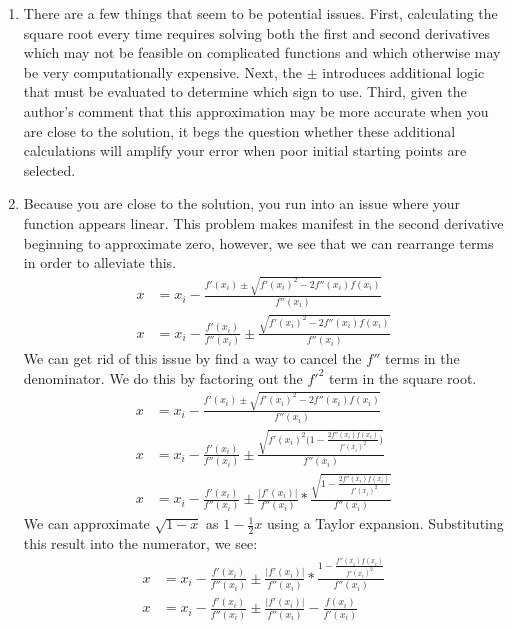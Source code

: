 \documentclass[11pt,a4paper]{article}
\begin{document}
\begin{itemize}
\begin{enumerate} [label={\alph*)}]
					\item There are a few things that seem to be potential issues. First, calculating the square root every time requires solving both the first and second derivatives which may not be feasible on complicated functions and which otherwise may be very computationally expensive. Next, the $\pm$ introduces additional logic that must be evaluated to determine which sign to use. Third, given the author's comment that this approximation may be more accurate when you are close to the solution, it begs the question whether these additional calculations will amplify your error when poor initial starting points are selected.
					
					\item Because you are close to the solution, you run into an issue where your function appears linear. This problem makes manifest in the second derivative beginning to approximate zero, however, we see that we can rearrange terms in order to alleviate this.
					\begin{align*}
						x &= x_i - \frac{f'(x_i)\pm \sqrt{f'(x_i)^2-2f''(x_i)f(x_i)}}{f''(x_i)} \\
						x &= x_i - \frac{f'(x_i)}{f''(x_i)} \pm\frac{\sqrt{f'(x_i)^2-2f''(x_i)f(x_i)}}{f''(x_i)}
					\end{align*}
					We can get rid of this issue by find a way to cancel the $f''$ terms in the denominator. We do this by factoring out the $f'^2$ term in the square root.
					\begin{align*}
						x &= x_i - \frac{f'(x_i)\pm \sqrt{f'(x_i)^2-2f''(x_i)f(x_i)}}{f''(x_i)} \\
						x &= x_i - \frac{f'(x_i)}{f''(x_i)} \pm\frac{\sqrt{f'(x_i)^2\Big(1-\frac{2f''(x_i)f(x_i)}{f'(x_i)^2}\Big)}}{f''(x_i)} \\
						x &= x_i - \frac{f'(x_i)}{f''(x_i)} \pm \frac{\vert f'(x_i)\vert}{f''(x_i)} *\frac{\sqrt{1-\frac{2f''(x_i)f(x_i)}{f'(x_i)^2}}}{f''(x_i)}
					\end{align*}
					We can approximate $\sqrt{1-x}$ as $1-\frac{1}{2}x$ using a Taylor expansion. Substituting this result into the numerator, we see:
					\begin{align*}
						x &= x_i - \frac{f'(x_i)}{f''(x_i)} \pm \frac{\vert f'(x_i)\vert}{f''(x_i)} *\frac{1-\frac{f''(x_i)f(x_i)}{f'(x_i)^2}}{f''(x_i)} \\
						x &= x_i - \frac{f'(x_i)}{f''(x_i)} \pm \frac{\vert f'(x_i)\vert}{f''(x_i)}-\frac{f(x_i)}{f'(x_i)} \\
					\end{align*}
					

\end{enumerate}
\end{itemize}
\end{document}
